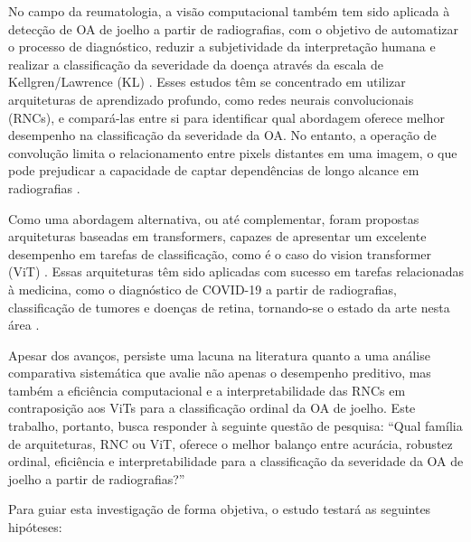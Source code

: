 No campo da reumatologia, a visão computacional também tem sido aplicada à detecção de OA de joelho a partir de radiografias, com o objetivo de automatizar o processo de diagnóstico, reduzir a subjetividade da interpretação humana e realizar a classificação da severidade da doença através da escala de Kellgren/Lawrence (KL) \cite{Mohammed2023}. Esses estudos têm se concentrado em utilizar arquiteturas de aprendizado profundo, como redes neurais convolucionais (RNCs), e compará-las entre si para identificar qual abordagem oferece melhor desempenho na classificação da severidade da OA. No entanto, a operação de convolução limita o relacionamento entre pixels distantes em uma imagem, o que pode prejudicar a capacidade de captar dependências de longo alcance em radiografias \cite{Shamshad2023}.

Como uma abordagem alternativa, ou até complementar, foram propostas arquiteturas baseadas em transformers, capazes de apresentar um excelente desempenho em tarefas de classificação, como é o caso do vision transformer (ViT) \cite{Dosovitskiy2021}. Essas arquiteturas têm sido aplicadas com sucesso em tarefas relacionadas à medicina, como o diagnóstico de COVID-19 a partir de radiografias, classificação de tumores e doenças de retina, tornando-se o estado da arte nesta área \cite{Shamshad2023}.

Apesar dos avanços, persiste uma lacuna na literatura quanto a uma análise comparativa sistemática que avalie não apenas o desempenho preditivo, mas também a eficiência computacional e a interpretabilidade das RNCs em contraposição aos ViTs para a classificação ordinal da OA de joelho. Este trabalho, portanto, busca responder à seguinte questão de pesquisa: ``Qual família de arquiteturas, RNC ou ViT, oferece o melhor balanço entre acurácia, robustez ordinal, eficiência e interpretabilidade para a classificação da severidade da OA de joelho a partir de radiografias?''

Para guiar esta investigação de forma objetiva, o estudo testará as seguintes hipóteses:

